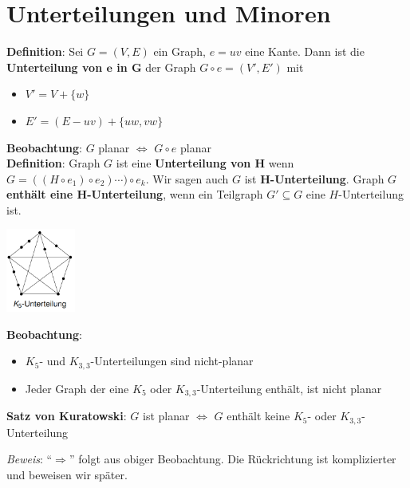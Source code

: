 \section{Unterteilungen und Minoren}

\textbf{Definition}: Sei $G=(V,E)$ ein Graph, $e=uv$ eine Kante. Dann ist die \textbf{Unterteilung von $\boldsymbol{e}$ in $\boldsymbol{G}$} der Graph $G\circ e=(V',E')$ mit
\begin{itemize}
	\item $V'=V+\{w\}$
	\item $E'=(E-uv)+\{uw,vw\}$
\end{itemize}
\bigskip
\textbf{Beobachtung}: $G$ planar $\iff$ $G\circ e$ planar\\

\textbf{Definition}: Graph $G$ ist eine \textbf{Unterteilung von $\boldsymbol{H}$} wenn $G=((H \circ e_1)\circ e_2)\cdots)\circ e_k$.
Wir sagen auch $G$ ist $\boldsymbol{H}$\textbf{-Unterteilung}.
Graph $G$ \textbf{enthält eine $\boldsymbol{H}$-Unterteilung}, wenn ein Teilgraph $G'\subseteq G$ eine $H$-Unterteilung ist.

\begin{center}
	\includegraphics[width=0.17\textwidth]{images/k5-unterteilung.png}
\end{center}

\textbf{Beobachtung}: 
\begin{itemize}
	\item $K_5$- und $K_{3,3}$-Unterteilungen sind nicht-planar
	\item Jeder Graph der eine $K_5$ oder $K_{3,3}$-Unterteilung enthält, ist nicht planar
\end{itemize}
\bigskip
\textbf{Satz von Kuratowski}: $G$ ist planar $\iff$ $G$ enthält keine $K_5$- oder $K_{3,3}$-Unterteilung

\textit{Beweis}: \enquote{$\Rightarrow$} folgt aus obiger Beobachtung. Die Rückrichtung ist komplizierter und beweisen wir später.\\

